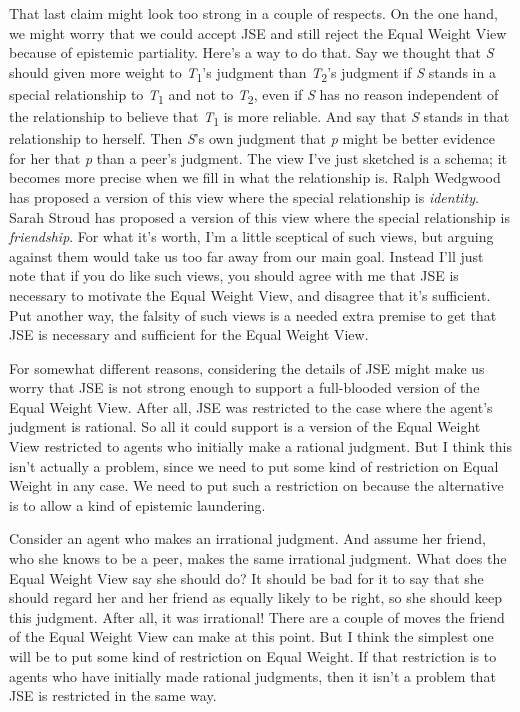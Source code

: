 \documentclass[
  10pt,
  letterpaper,
  DIV=11,
  numbers=noendperiod,
  twoside]{scrartcl}
\begin{document}
That last claim might look too strong in a couple of respects. On the
one hand, we might worry that we could accept JSE and still reject the
Equal Weight View because of epistemic partiality. Here's a way to do
that. Say we thought that \emph{S} should given more weight to
\emph{T}\textsubscript{1}'s judgment than \emph{T}\textsubscript{2}'s
judgment if \emph{S} stands in a special relationship to
\emph{T}\textsubscript{1} and not to \emph{T}\textsubscript{2}, even if
\emph{S} has no reason independent of the relationship to believe that
\emph{T}\textsubscript{1} is more reliable. And say that \emph{S} stands
in that relationship to herself. Then \emph{S}'s own judgment that
\emph{p} might be better evidence for her that \emph{p} than a peer's
judgment. The view I've just sketched is a schema; it becomes more
precise when we fill in what the relationship is. Ralph Wedgwood has
proposed a version of this view where the special relationship is
\emph{identity}. Sarah Stroud has proposed a version of this view where
the special relationship is \emph{friendship}. For what it's worth, I'm
a little sceptical of such views, but arguing against them would take us
too far away from our main goal. Instead I'll just note that if you do
like such views, you should agree with me that JSE is necessary to
motivate the Equal Weight View, and disagree that it's sufficient. Put
another way, the falsity of such views is a needed extra premise to get
that JSE is necessary and sufficient for the Equal Weight View.

For somewhat different reasons, considering the details of JSE might
make us worry that JSE is not strong enough to support a full-blooded
version of the Equal Weight View. After all, JSE was restricted to the
case where the agent's judgment is rational. So all it could support is
a version of the Equal Weight View restricted to agents who initially
make a rational judgment. But I think this isn't actually a problem,
since we need to put some kind of restriction on Equal Weight in any
case. We need to put such a restriction on because the alternative is to
allow a kind of epistemic laundering.

Consider an agent who makes an irrational judgment. And assume her
friend, who she knows to be a peer, makes the same irrational judgment.
What does the Equal Weight View say she should do? It should be bad for
it to say that she should regard her and her friend as equally likely to
be right, so she should keep this judgment. After all, it was
irrational! There are a couple of moves the friend of the Equal Weight
View can make at this point. But I think the simplest one will be to put
some kind of restriction on Equal Weight. If that restriction is to
agents who have initially made rational judgments, then it isn't a
problem that JSE is restricted in the same way.
\end{document}
